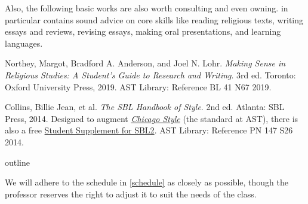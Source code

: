 \documentclass[titlepage]{article}
\begin{document}
Also, the following basic works are also worth consulting and even owning.
\cite{rlgs} in particular contains sound advice on core skills like
reading religious texts, writing essays and reviews, revising essays,
making oral presentations, and learning languages.

\begingroup
\renewcommand{\section}[2]{}%
\begin{thebibliography}{Making}%

	 Northey, Margot, Bradford A. Anderson, and Joel N. Lohr.
	\emph{Making Sense in Religious Studies: A Student's Guide to Research and Writing}.
	3rd ed. Toronto: Oxford University Press, 2019. AST Library: Reference BL 41 N67 2019.

	 Collins, Billie Jean, et al.
	\emph{The SBL Handbook of Style}.
	2nd ed. Atlanta: SBL Press, 2014.
	Designed to augment \href{https://proxy.openathens.net/login?qurl=https%3A%2F%2Fwww.chicagomanualofstyle.org%2Fbook%2Fed17%2Ffrontmatter%2Ftoc.html}{\emph{Chicago Style}}
	(the standard at AST), there is also a free
	\href{https://www.sbl-site.org/wp-content/uploads/2025/04/SBLHSsupp2015-02.pdf}{Student Supplement for SBL2}. AST Library: Reference PN 147 S26 2014.

\end{thebibliography}
\endgroup

\section{Course Outline}
\label{outline}

We will adhere to the schedule in \autoref{schedule} as closely as
possible, though the professor reserves the right to adjust it to suit
the needs of the class.
\end{document}
